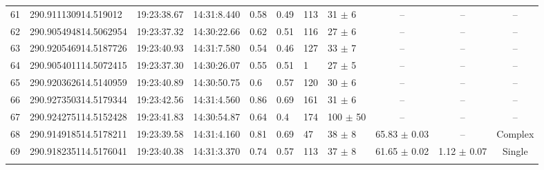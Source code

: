 \documentclass[longauth]{aa} %
\begin{document}
\begin{appendix}
\begin{table}[htbp!]
\begin{tabular}{llllllllccc}
61  &  290.911130914.519012  &  19:23:38.67  &  14:31:8.440  &  0.58  &  0.49  &  113  &  31 $\pm$ 6  &  --  &  --  &  -- \\
62  &  290.905494814.5062954  &  19:23:37.32  &  14:30:22.66  &  0.62  &  0.51  &  116  &  27 $\pm$ 6  &  --  &  --  &  -- \\
63  &  290.920546914.5187726  &  19:23:40.93  &  14:31:7.580  &  0.54  &  0.46  &  127  &  33 $\pm$ 7  &  --  &  --  &  -- \\
64  &  290.905401114.5072415  &  19:23:37.30  &  14:30:26.07  &  0.55  &  0.51  &  1  &  27 $\pm$ 5  &  --  &  --  &  -- \\
65  &  290.920362614.5140959  &  19:23:40.89  &  14:30:50.75  &  0.6  &  0.57  &  120  &  30 $\pm$ 6  &  --  &  --  &  -- \\
66  &  290.927350314.5179344  &  19:23:42.56  &  14:31:4.560  &  0.86  &  0.69  &  161  &  31 $\pm$ 6  &  --  &  --  &  -- \\
67  &  290.924275114.5152428  &  19:23:41.83  &  14:30:54.87  &  0.64  &  0.4  &  174  &  100 $\pm$ 50  &  --  &  --  &  -- \\
68  &  290.914918514.5178211  &  19:23:39.58  &  14:31:4.160  &  0.81  &  0.69  &  47  &  38 $\pm$ 8  &  65.83 $\pm$ 0.03  &  --  &  Complex \\
69  &  290.918235114.5176041  &  19:23:40.38  &  14:31:3.370  &  0.74  &  0.57  &  113  &  37 $\pm$ 8  &  61.65 $\pm$ 0.02  &  1.12 $\pm$ 0.07  &  Single \\
\hline \noalign {\smallskip}
\end{tabular}
\end{table}




\end{appendix}
\end{document}
